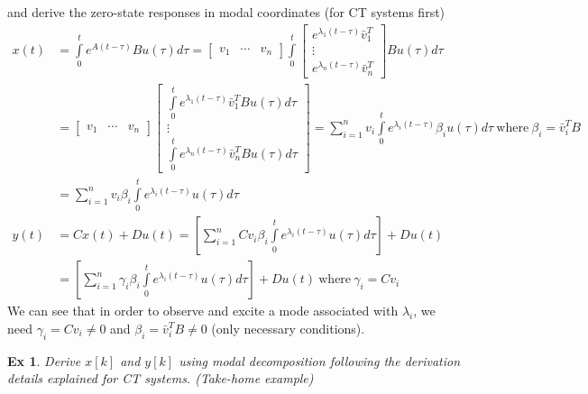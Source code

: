 \documentclass[twoside]{article}
\newtheorem{exmp}[theorem]{Ex}
\begin{document}
%
and derive the zero-state responses in modal coordinates (for CT
systems first)
%
\begin{align*}
    x(t) &= \int\limits_{0}^{t} e^{A ( t - \tau ) } B u(\tau) d \tau = \begin{bmatrix} v_1 & \cdots & v_n \end{bmatrix} \int\limits_{0}^{t} 
    \begin{bmatrix} e^{\lambda_1 (t - \tau)} \bar{v}_1^T \\ \vdots \\ e^{\lambda_n (t - \tau)} \bar{v}_n^T \end{bmatrix}  B u(\tau) d \tau
\\[1ex]
&= \begin{bmatrix} v_1 & \cdots & v_n \end{bmatrix} 
    \begin{bmatrix} \int\limits_{0}^{t} e^{\lambda_1 (t - \tau)} \bar{v}_1^T B u(\tau) d \tau \\ \vdots \\ \int\limits_{0}^{t} e^{\lambda_n (t - \tau)} \bar{v}_n^T B u(\tau) d \tau \end{bmatrix}  
    =  \sum\limits_{i=1}^n v_i \int\limits_{0}^{t} e^{\lambda_i (t - \tau)} \beta_i u(\tau) d \tau \ \mathrm{where} \ \beta_i = \bar{v}_i^T B
    \\[1ex]
    &= \sum\limits_{i=1}^n v_i \beta_i \int\limits_{0}^{t} e^{\lambda_i (t - \tau)} u(\tau) d \tau 
    \\[1ex]
    y(t) &= C x(t) + D u(t) = \left[ \sum\limits_{i=1}^n C v_i \beta_i \int\limits_{0}^{t} e^{\lambda_i (t - \tau)} u(\tau) d \tau \right] + D u(t)
    \\ &= \left[ \sum\limits_{i=1}^n \gamma_i  \beta_i \int\limits_{0}^{t} e^{\lambda_i (t - \tau)} u(\tau) d \tau \right] + D u(t) \ \mathrm{where} \ \gamma_i = C v_i
\end{align*}
%
We can see that in order to observe and excite a mode associated with $\lambda_i$, we need $\gamma_i = C v_i \neq 0$ and $\beta_i = \bar{v}_i^T B \neq 0$ (only necessary conditions).
%
\begin{exmp}
    Derive $x[k]$ and $y[k]$ using modal decomposition following the derivation details explained for CT systems. (Take-home example)
\end{exmp}
\end{document}
